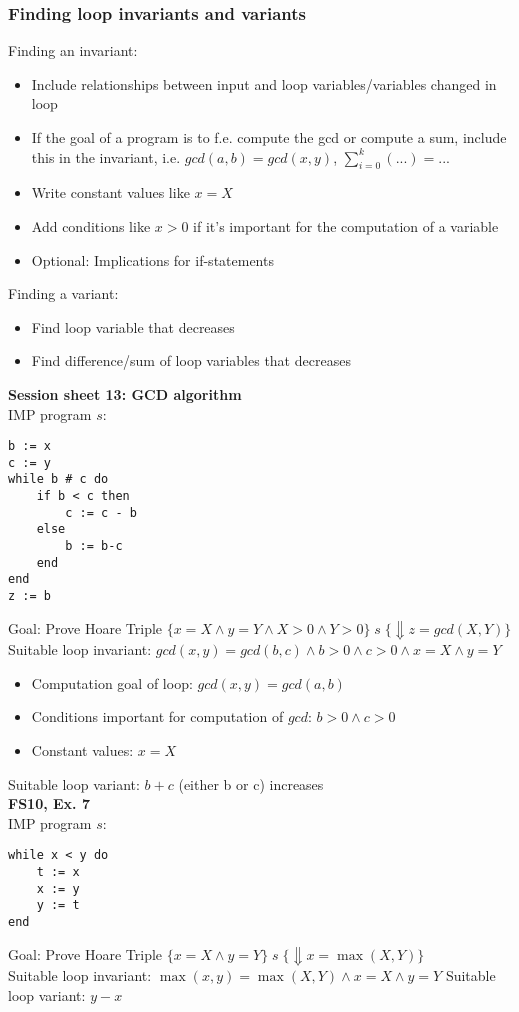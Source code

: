\documentclass{article}
\begin{document}
\subsubsection{Finding loop invariants and variants}
Finding an invariant: \begin{itemize}
    \item Include relationships between input and loop variables/variables changed in loop
    \item If the goal of a program is to f.e. compute the gcd or compute a sum, include
    this in the invariant, i.e. $gcd(a,b)=gcd(x,y)$, $\sum_{i=0}^{k}(...)=...$
    \item Write constant values like $x=X$
    \item Add conditions like $x>0$ if it's important for the computation of a variable
    \item Optional: Implications for if-statements
\end{itemize}
Finding a variant:
\begin{itemize}
    \item Find loop variable that decreases
    \item Find difference/sum of loop variables that decreases
\end{itemize}
\smallskip
\textbf{Session sheet 13: GCD algorithm} \\
IMP program $s$:
\begin{verbatim}
b := x
c := y
while b # c do
    if b < c then
        c := c - b
    else
        b := b-c
    end
end
z := b
\end{verbatim}
Goal: Prove Hoare Triple 
$\{x=X \land y=Y\land X > 0 \land Y >0\} \; s \; \{\Downarrow z=gcd(X,Y)\}$ \\
Suitable loop invariant: $gcd(x,y)=gcd(b,c) \land b >0 \land c > 0 \land x=X \land y=Y$ 
\begin{itemize}
    \item Computation goal of loop: $gcd(x,y) = gcd(a,b)$
    \item Conditions important for computation of $gcd$: $b>0 \land c > 0$
    \item Constant values: $x=X$
\end{itemize}
Suitable loop variant: $b+c$ (either b or c) increases
 \smallskip \\
\textbf{FS10, Ex. 7} \\
IMP program $s$:
\begin{verbatim}
while x < y do
    t := x
    x := y
    y := t
end
\end{verbatim}
Goal: Prove Hoare Triple $\{x=X \land y=Y\} \; s \; \{\Downarrow x = \max(X,Y)\}$ \\
Suitable loop invariant: $\max(x,y)=\max(X,Y) \land x=X \land y=Y$
Suitable loop variant: $y-x$ 
\end{document}
